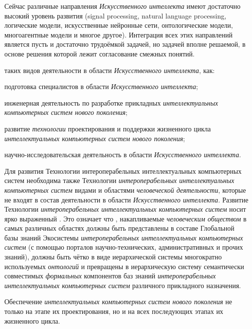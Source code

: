 \begin{textitemize}
	Сейчас различные направления \textit{Искусственного интеллекта} имеют достаточно высокий уровень развития (signal processing, natural language processing, логические модели, искусственные нейронные сети, онтологические модели, многоагентные модели и многое другое). Интеграция всех этих направлений является пусть и достаточно трудоёмкой задачей, но задачей вполне решаемой, в основе решения которой лежит согласование смежных понятий.
	\medskip
	\item {} таких видов деятельности в области \textit{Искусственного интеллекта}, как:
	\begin{textitemize}
		\item подготовка специалистов в области \textit{Искусственного интеллекта};
		\item инженерная деятельность по разработке прикладных \textit{интеллектуальных компьютерных систем нового поколения};
		\item развитие \textit{технологии} проектирования и поддержки жизненного цикла \textit{интеллектуальных компьютерных систем нового поколения};
		\item научно-исследовательская деятельность в области \textit{Искусственного интеллекта}.
	\end{textitemize}
	\item Для развития Технологии интероперабельных интеллектуальных компьютерных систем необходима также  Технологии \textit{интероперабельных интеллектуальных компьютерных систем}  видами и областями \textit{человеческой деятельности}, которые не входят в состав деятельности в области \textit{Искусственного интеллекта}. Развитие Технологии \textit{интероперабельных интеллектуальных компьютерных систем} носит ярко выраженный . Это означает что , накапливаемые \textit{человеческим обществом} в самых различных областях должны быть представлены в составе Глобальной базы знаний Экосистемы \textit{интероперабельных интеллектуальных компьютерных систем} (с помощью порталов научно-технических, административных и прочих знаний), должны быть чётко  в виде иерархической системы  многократно используемых \textit{онтологий} и превращены в иерархическую систему семантически совместимых \textit{формальных} компонентов баз знаний \textit{интероперабельных интеллектуальных компьютерных систем} различного прикладного назначения.
	\medskip
	\item Обеспечение  \textit{интеллектуальных компьютерных систем нового поколения} не только на этапе их проектирования, но и на всех последующих этапах их жизненного цикла.

\end{textitemize}

